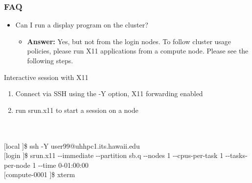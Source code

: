 \documentclass[t,hyperref={pdfpagelabels=false}]{beamer}
\newcommand{\ctilde}{{\fontfamily{ptm}\selectfont\texttildelow}}
\newcommand{\ddash}{-{}-}
\begin{document}
\begin{frame}	
\frametitle{FAQ}
\begin{itemize}
  \item Can I run a display program on the cluster?
    \begin{itemize}
      \item \textbf{Answer:} Yes, but not from the login nodes.  To follow cluster usage policies, please run X11 applications from a compute node.  Please see the following steps.
\end{itemize}
\end{itemize}
 \begin{block}{Interactive session with X11}\tiny  
       \begin{enumerate}
      \item Connect via SSH using the -Y option, X11 forwarding enabled
      \item run srun.x11 to start a session on a node
      \end{enumerate}
      \
      ~\\
      ~\\
      $[$local \ctilde$]$\$ ssh -Y user99@uhhpc1.its.hawaii.edu	~\\
      $[$login \ctilde$]$\$ srun.x11 \ddash{}immediate \ddash{}partition sb.q \ddash{}nodes 1 \ddash{}cpus-per-task 1 \ddash{}tasks-per-node 1 \ddash{}time 0-01:00:00	~\\
      $[$compute-0001 \ctilde$]$\$ xterm	~\\
 \end{block}

\end{frame}
\end{document}
